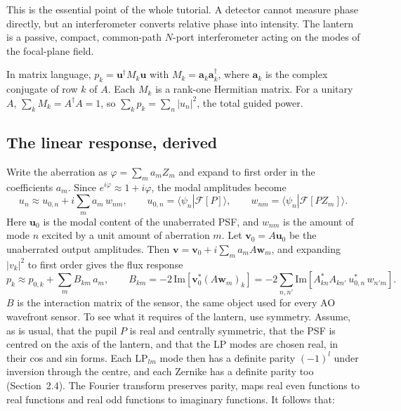 \documentclass[11pt,a4paper]{article}
\newcommand{\uvec}{\mathbf{u}}
\newcommand{\vvec}{\mathbf{v}}
\newcommand{\braket}[2]{\langle #1|#2\rangle}
\begin{document}
This is the essential point of the whole tutorial. A detector cannot measure phase directly, but an interferometer converts relative phase into intensity. The lantern is a passive, compact, common-path $N$-port interferometer acting on the modes of the focal-plane field.

In matrix language, $p_k = \uvec^\dagger M_k \uvec$ with $M_k = \mathbf{a}_k \mathbf{a}_k^\dagger$, where $\mathbf{a}_k$ is the complex conjugate of row $k$ of $A$. Each $M_k$ is a rank-one Hermitian matrix. For a unitary $A$, $\sum_k M_k = A^\dagger A = 1$, so $\sum_k p_k = \sum_n |u_n|^2$, the total guided power.

\subsection{The linear response, derived}
\label{sec:sign}
Write the aberration as $\varphi = \sum_m a_m Z_m$ and expand to first order in the coefficients $a_m$. Since $e^{i\varphi} \approx 1 + i\varphi$, the modal amplitudes become
\begin{equation}
u_n \approx u_{0,n} + i \sum_m a_m\, w_{nm},
\qquad
u_{0,n} = \braket{\psi_n}{\mathcal{F}[P]},
\qquad
w_{nm} = \braket{\psi_n}{\mathcal{F}[P Z_m]}.
\label{eq:linear_u}
\end{equation}
Here $\uvec_0$ is the modal content of the unaberrated PSF, and $w_{nm}$ is the amount of mode $n$ excited by a unit amount of aberration $m$. Let $\vvec_0 = A\uvec_0$ be the unaberrated output amplitudes. Then $\vvec = \vvec_0 + i\sum_m a_m A \mathbf{w}_m$, and expanding $|v_k|^2$ to first order gives the flux response
\begin{equation}
p_k \approx p_{0,k} + \sum_m B_{km}\, a_m,
\qquad
B_{km} = -2\,\mathrm{Im}\!\left[ \mathbf{v}_0^* (A\mathbf{w}_m)_k \right] = -2\sum_{n,n'} \mathrm{Im}\!\left[ A_{kn}^* A_{kn'}\, u_{0,n}^*\, w_{n'm} \right].
\label{eq:linear_p}
\end{equation}
$B$ is the interaction matrix of the sensor, the same object used for every AO wavefront sensor. To see what it requires of the lantern, use symmetry. Assume, as is usual, that the pupil $P$ is real and centrally symmetric, that the PSF is centred on the axis of the lantern, and that the LP modes are chosen real, in their cos and sin forms. Each $\mathrm{LP}_{lm}$ mode then has a definite parity $(-1)^l$ under inversion through the centre, and each Zernike has a definite parity too (Section~2.4). The Fourier transform preserves parity, maps real even functions to real functions and real odd functions to imaginary functions. It follows that:
\end{document}
